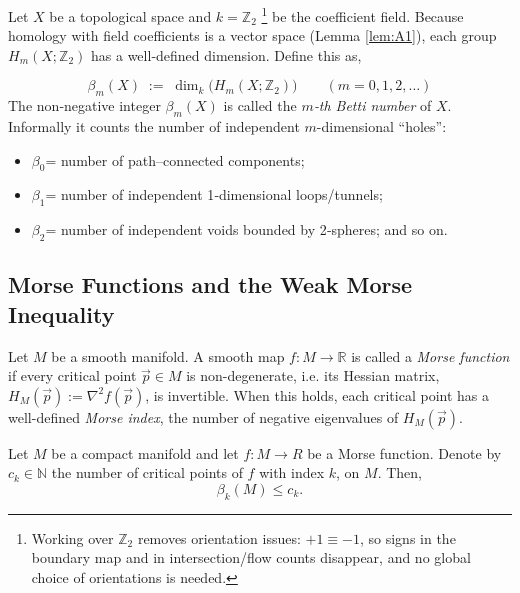 \begin{definition}
Let \(X\) be a topological space and \(k=\mathbb{Z}_2\)
\footnote{Working over $\mathbb{Z}_2$ removes orientation issues: $+1\equiv-1$, so signs in the boundary map and in intersection/flow counts disappear, and no global choice of orientations is needed.} be the coefficient field. Because homology with field coefficients is a vector space (Lemma \ref{lem:A1}), each group
$H_{m}(X;\mathbb{Z}_2)$ has a well‑defined dimension. Define this as,

\[
\beta_{m}(X)
\;:=\;
\dim_{k}\! \bigl( H_{m}(X;\mathbb{Z}_2) \bigr)
\qquad (m = 0,1,2,\dots)
\]
The non‑negative integer \(\beta_{m}(X)\) is called the
\emph{$m$‑th Betti number} of \(X\).
Informally it counts the number of independent
\(m\)-dimensional “holes”:

\begin{itemize}
  \item \(\beta_{0}\)= number of path–connected components;
  \item \(\beta_{1}\)= number of independent 1‑dimensional loops/tunnels;
  \item \(\beta_{2}\)= number of independent voids bounded by 2‑spheres;  
        and so on.
\end{itemize}
\end{definition}

\subsection{Morse Functions and the Weak Morse Inequality}

\begin{definition}
  Let $M$ be a smooth manifold.  
  A smooth map \(f \colon M \to \mathbb R\) is called a \emph{Morse function} if every critical point $\vec{p}\in M$ is non-degenerate, i.e. its Hessian matrix, $H_M(\vec{p}):=\nabla^2 f(\vec{p})$, is invertible.
  When this holds, each critical point has a well-defined \emph{Morse index},
  the number of negative eigenvalues of $H_M(\vec{p})$.
\end{definition}

\begin{theorem} \label{MorseIneq}
Let $M$ be a compact manifold and let $f:M\rightarrow R$ be a Morse function. Denote by $c_k \in \mathbb{N}$ the number of critical points of $f$ with index $k$, on $M$. Then,
$$\beta_k(M) \leq c_k.$$
\end{theorem}

